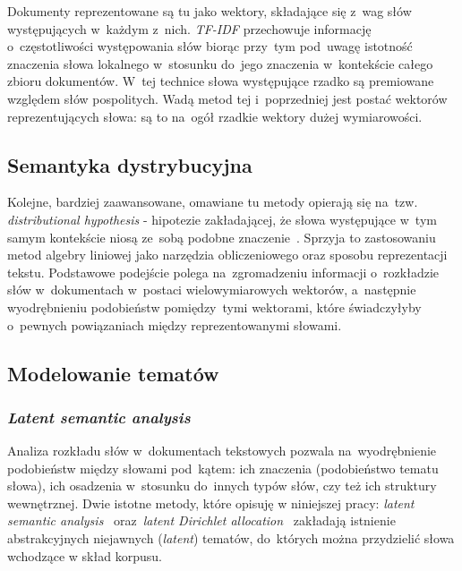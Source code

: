 \documentclass[pl]{minipw} %
\begin{document}
Dokumenty reprezentowane są tu jako wektory, składające się z~wag słów występujących w~każdym z~nich. \textit{TF-IDF} przechowuje informację o~częstotliwości występowania słów biorąc przy~tym pod~uwagę istotność znaczenia słowa lokalnego w~stosunku do~jego znaczenia w~kontekście całego zbioru dokumentów. W~tej technice słowa występujące rzadko są premiowane względem słów pospolitych. Wadą metod tej i~poprzedniej jest postać wektorów reprezentujących słowa: są to na~ogół rzadkie wektory dużej wymiarowości.

\subsection{Semantyka dystrybucyjna}
Kolejne, bardziej zaawansowane, omawiane tu metody opierają się na~tzw. \textit{distributional hypothesis} - hipotezie zakładającej, że słowa występujące w~tym samym kontekście niosą ze~sobą podobne znaczenie~\cite{bow}\cite{firth}. Sprzyja to zastosowaniu metod algebry liniowej jako narzędzia obliczeniowego oraz sposobu reprezentacji tekstu. Podstawowe podejście polega na~zgromadzeniu informacji o~rozkładzie słów w~dokumentach w~postaci wielowymiarowych wektorów, a~następnie wyodrębnieniu podobieństw pomiędzy~tymi wektorami, które świadczyłyby o~pewnych powiązaniach między reprezentowanymi słowami.

\subsection{Modelowanie tematów}

\subsubsection{\textit{Latent semantic analysis}}
Analiza rozkładu słów w~dokumentach tekstowych pozwala na~wyodrębnienie podobieństw między słowami pod~kątem: ich znaczenia (podobieństwo tematu słowa), ich osadzenia w~stosunku do~innych typów słów, czy też ich struktury wewnętrznej. Dwie istotne metody, które opisuję w niniejszej pracy: \textit{latent semantic analysis}~\cite{lsa} oraz~\textit{latent Dirichlet allocation}~\cite{lda} zakładają istnienie abstrakcyjnych niejawnych (\textit{latent}) tematów, do~których można przydzielić słowa wchodzące w skład korpusu.
\end{document}
